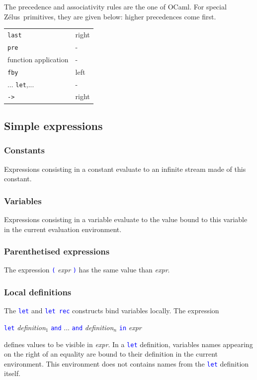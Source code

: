 \documentclass[11pt,titlepage,twoside]{report}
\newcommand{\zelus}{{\sf Z\'elus}}
\newcommand{\ocaml}{{\sf OCaml}}
\newcommand{\Let}{\mbox{{\tt let}}}
\newcommand{\Rec}{\mbox{{\tt rec}}}
\newcommand{\In}{\mbox{{\tt in}}}
\newcommand{\AND}{\mbox{{\tt and}}}
\newcommand{\Pre}{\mbox{{\tt pre}}}
\newcommand{\Last}{\mbox{{\tt last}}}
\newcommand{\Fby}{\mbox{{\tt fby}}}
\newcommand{\Minusgreater}{\mbox{{\tt ->}}}
\newcommand{\term}[1]{\textcolor{Blue}{\tt #1}}
\newcommand{\nterm}[1]{\textcolor{BrickRed}{\it #1}}
\newcommand{\term}[1]{{\tt #1}}
\newcommand{\nterm}[1]{{\em #1}}
\begin{document}
The precedence and associativity rules are the one of \ocaml. For
special \zelus\ primitives, they are given below:
higher precedences come first.
\begin{center}
{
\begin{tabular}{|l|l|} \hline
\Last                           & right         \\
\Pre                            & -             \\
function application            & -             \\
\Fby                            & left          \\
...
\Let,...                        & -             \\ 
\Minusgreater                   & right         \\ \hline
\end{tabular}
}
\end{center}

\subsection{Simple expressions\label{simpleexpressions}} %
\subsubsection{Constants} %

Expressions consisting in a constant evaluate to an infinite stream
made of this constant.

\subsubsection{Variables} %

Expressions consisting in a variable evaluate to the value bound to
this variable in the current evaluation environment.

\subsubsection{Parenthetised expressions} %
The expression \term{(} \nterm{expr} \term{)} has the same value than
\nterm{expr}.

\subsubsection{Local definitions} %

The \term{\Let} and \term{\Let\ \Rec} constructs bind variables
locally. The expression 
\begin{center}
  \term{\Let} \nterm{definition}$_1$ \term{\AND} ... 
  \term{\AND} \nterm{definition}$_n$ \term{\In} \nterm{expr}
\end{center}
defines values to be visible in \nterm{expr}. In a \term{\Let} definition,
variables names appearing on the right of an equality are bound to their definition
in the current environment. This environment does not contains names from
the \term{\Let} definition itself.
\end{document}
